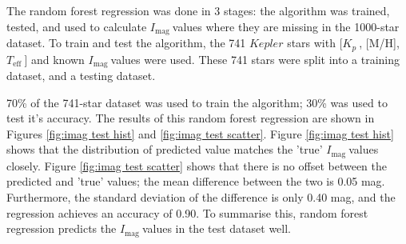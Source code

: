 \documentclass[a4paper,fleqn,usenatbib,useAMS]{mnras}
\newcommand{\teff}{\ensuremath{T_{\textrm{eff}}\:}}
\newcommand{\kp}{\ensuremath{K_{p}\:}}
\newcommand{\imag}{\ensuremath{I_{\textrm{mag}}\:}}
\begin{document}
The random forest regression was done in 3 stages: the algorithm was trained, tested, and used to calculate \imag values where they are missing in the 1000-star dataset. To train and test the algorithm, the 741 $Kepler$ stars with [\kp, [M/H], \teff] and known \imag values were used. These 741 stars were split into a training dataset, and a testing dataset.

70\% of the 741-star dataset was used to train the algorithm; 30\% was used to test it's accuracy. The results of this random forest regression are shown in Figures \ref{fig:imag test hist} and \ref{fig:imag test scatter}. Figure \ref{fig:imag test hist} shows that the distribution of predicted value matches the 'true' \imag values closely. Figure \ref{fig:imag test scatter} shows that there is no offset between the predicted and 'true' values; the mean difference between the two is 0.05 mag. Furthermore, the standard deviation of the difference is only 0.40 mag, and the regression achieves an accuracy of 0.90. To summarise this, random forest regression predicts the \imag values in the test dataset well.
\end{document}
